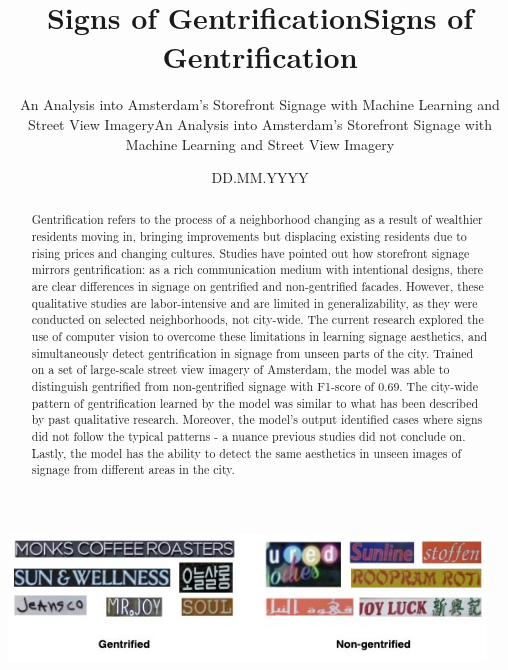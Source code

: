 \documentclass[ds, nofrontpicture, nofirstcompanypicture, nosecondcompanypicture]{mscthesis}
\title{Signs of Gentrification}
\subtitle{An Analysis into Amsterdam's Storefront Signage with Machine Learning and Street View Imagery}
\date{DD.MM.YYYY}
\begin{document}
\pagestyle{plain}
\setcounter{page}{1}

\maketitlepage
\fixemptypage

\title{Signs of Gentrification}
\subtitle{An Analysis into Amsterdam's Storefront Signage with Machine Learning and Street View Imagery}

\begin{abstract}
Gentrification refers to the process of a neighborhood changing as a result of wealthier residents moving in, bringing improvements but displacing existing residents due to rising prices and changing cultures. Studies have pointed out how storefront signage mirrors gentrification: as a rich communication medium with intentional designs, there are clear differences in signage on gentrified and non-gentrified facades. However, these qualitative studies are labor-intensive and are limited in generalizability, as they were conducted on selected neighborhoods, not city-wide. The current research explored the use of computer vision to overcome these limitations in learning signage aesthetics, and simultaneously detect gentrification in signage from unseen parts of the city. Trained on a set of large-scale street view imagery of Amsterdam, the model was able to distinguish gentrified from non-gentrified signage with F1-score of 0.69. The city-wide pattern of gentrification learned by the model was similar to what has been described by past qualitative research. Moreover, the model's output identified cases where signs did not follow the typical patterns - a nuance previous studies did not conclude on. Lastly, the model has the ability to detect the same aesthetics in unseen images of signage from different areas in the city.
\end{abstract}

\begin{teaserfigure}
    \includegraphics[width=0.95\textwidth]{media/titlepage/output_vis-frontman.jpg}
\end{teaserfigure}

\maketitle
\end{document}
